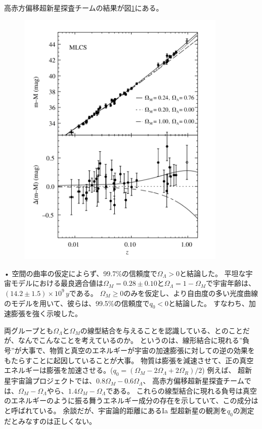 \documentclass[11pt,a4paper,dvipdfmx]{jsarticle}
\theoremstyle{plain}
\theoremstyle{break}
\begin{document}
高赤方偏移超新星探査チームの結果が図\ref{fig:1-2}にある。
\begin{figure}[h]
	\centering
	\includegraphics[width=10cm]{figure/fig1-2}
	\label{fig:1-2}
	\caption{}
\end{figure}•%
空間の曲率の仮定によらず、99.7\%の信頼度で$\Omega_{\Lambda} > 0$と結論した。
平坦な宇宙モデルにおける最良適合値は$\Omega_{M}=0.28 \pm 0.10 $と$\Omega_{\Lambda}=1-\Omega_{M}$で宇宙年齢は、$(14.2\pm1.5)\times 10^ 9 \,y$である。
$\Omega_{M} \geq 0$のみを仮定し、より自由度の多い光度曲線のモデルを用いて、彼らは、99.5\%の信頼度で$q_0 < 0$と結論した。
すなわち、加速膨張を強く示唆した。

両グループとも$\Omega_{\Lambda}$と$\Omega_{M}$の線型結合を与えることを認識している、とのことだが、なんでこんなことを考えているのか。
というのは、線形結合に現れる”負号”が大事で、物質と真空のエネルギーが宇宙の加速膨張に対しての逆の効果をもたらすことに起因していることが大事。
物質は膨張を減速させて、正の真空エネルギーは膨張を加速させる。($q_0 = (\Omega_{M} - 2 \Omega_{\Lambda} + 2 \Omega_{R})/2$)
例えば、
超新星宇宙論プロジェクトでは、$0.8\Omega_{M} -  0.6  \Omega_{\Lambda}$、
高赤方偏移超新星探査チームでは、$\Omega_{M} -  \Omega_{\Lambda}$やら、$1.4 \Omega_{M} -   \Omega_{\Lambda}$である。
これらの線型結合に現れる負号は真空のエネルギーのように振る舞うエネルギー成分の存在を示していて、この成分はと呼ばれている。
余談だが、宇宙論的距離にあるIa 型超新星の観測を$q_0$の測定だとみなすのは正しくない。
\end{document}

